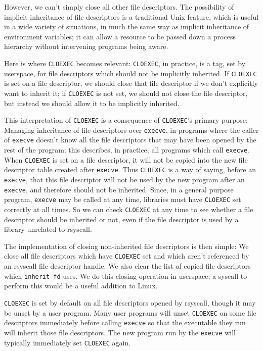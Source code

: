 \documentclass[sigplan]{acmart}
\begin{document}
However, we can't simply close all other file descriptors.
The possibility of implicit inheritance of file descriptors is a traditional Unix feature,
which is useful in a wide variety of situations,
in much the same way as implicit inheritance of environment variables;
it can allow a resource to be passed down a process hierarchy without intervening programs being aware.

Here is where \texttt{CLOEXEC} becomes relevant:
\texttt{CLOEXEC}, in practice,
is a tag, set by userspace, for file descriptors which should not be implicitly inherited.
If \texttt{CLOEXEC} is set on a file descriptor,
we should close that file descriptor if we don't explicitly want to inherit it;
if \texttt{CLOEXEC} is not set, we should not close the file descriptor,
but instead we should allow it to be implicitly inherited.

This interpretation of \texttt{CLOEXEC} is a consequence of \texttt{CLOEXEC}'s primary purpose:
Managing inheritance of file descriptors over \texttt{execve},
in programs where the caller of \texttt{execve}
doesn't know all the file descriptors that may have been opened by the rest of the program;
this describes, in practice, all programs which call \texttt{execve}.
When \texttt{CLOEXEC} is set on a file descriptor,
it will not be copied into the new file descriptor table created after \texttt{execve}.
Thus \texttt{CLOEXEC} is a way of saying, before an \texttt{execve},
that this file descriptor will not be used by the new program after an \texttt{execve},
and therefore should not be inherited.
Since, in a general purpose program, \texttt{execve} may be called at any time,
libraries must have \texttt{CLOEXEC} set correctly at all times.
So we can check \texttt{CLOEXEC} at any time to see whether a file descriptor should be inherited or not,
even if the file descriptor is used by a library unrelated to rsyscall.

The implementation of closing non-inherited file descriptors is then simple:
We close all file descriptors which have \texttt{CLOEXEC} set
and which aren't referenced by an rsyscall file descriptor handle.
We also clear the list of copied file descriptors which \verb|inherit_fd| uses.
We do this closing operation in userspace;
a syscall to perform this would be a useful addition to Linux.

\texttt{CLOEXEC} is set by default on all file descriptors opened by rsyscall,
though it may be unset by a user program.
Many user programs will unset \texttt{CLOEXEC} on some file descriptors immediately before calling \texttt{execve}
so that the executable they run will inherit those file descriptors.
The new program run by the \texttt{execve} will typically immediately set \texttt{CLOEXEC} again.
\end{document}
